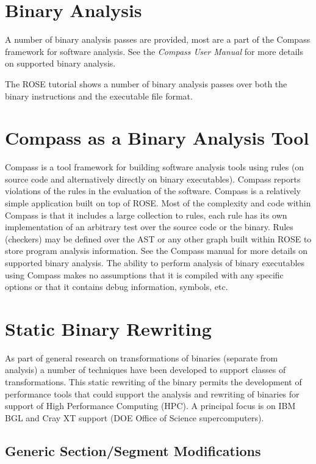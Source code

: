 \section{Binary Analysis}

   A number of binary analysis passes are provided, most are a part of the Compass
framework for software analysis.  See the {\em Compass User Manual} for more details on
supported binary analysis.

   The ROSE tutorial shows a number of binary analysis passes over both the binary
instructions and the executable file format.

\section{Compass as a Binary Analysis Tool}

   Compass is a tool framework for building software analysis tools using rules (on source
code and alternatively directly on binary executables). Compass
reports violations of the rules in the evaluation of the software.  Compass is a
relatively simple application built on top of ROSE.  Most of the complexity and code 
within Compass is that it includes a large collection to rules, each rule has its
own implementation of an arbitrary test over the source code or the binary.  Rules
(checkers) may be defined over the AST or any other graph built within ROSE to store 
program analysis information. See the Compass manual for more details on supported
binary analysis.  The ability to perform analysis of binary executables using Compass 
makes no assumptions that it is compiled with any specific options or that it contains
debug information, symbols, etc.


\section{Static Binary Rewriting}
   As part of general research on transformations of binaries (separate from analysis)
a number of techniques have been developed to support classes of transformations.
This static rewriting of the binary permits the development of performance tools 
that could support the analysis and rewriting of binaries for support of High 
Performance Computing (HPC). A principal focus is on IBM BGL and Cray XT support 
(DOE Office of Science supercomputers).

\subsection{Generic Section/Segment Modifications}

